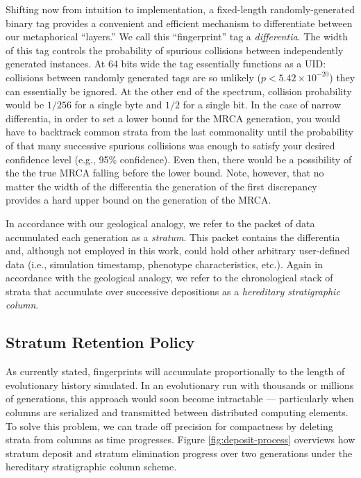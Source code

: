 Shifting now from intuition to implementation, a fixed-length randomly-generated binary tag provides a convenient and efficient mechanism to differentiate between our metaphorical ``layers.''
We call this ``fingerprint'' tag a \textit{differentia}.
The width of this tag controls the probability of spurious collisions between independently generated instances.
At 64 bits wide the tag essentially functions as a UID: collisions between randomly generated tags are so unlikely ($p < 5.42\times10^{-20}$) they can essentially be ignored.
At the other end of the spectrum, collision probability would be $1/256$ for a single byte and $1/2$ for a single bit.
In the case of narrow differentia, in order to set a lower bound for the MRCA generation, you would have to backtrack common strata from the last commonality until the probability of that many successive spurious collisions was enough to satisfy your desired confidence level (e.g., 95\% confidence).
Even then, there would be a possibility of the the true MRCA falling before the lower bound.
Note, however, that no matter the width of the differentia the generation of the first discrepancy provides a hard upper bound on the generation of the MRCA.

In accordance with our geological analogy, we refer to the packet of data accumulated each generation as a \textit{stratum}.
This packet contains the differentia and, although not employed in this work, could hold other arbitrary user-defined data (i.e., simulation timestamp, phenotype characteristics, etc.).
Again in accordance with the geological analogy, we refer to the chronological stack of strata that accumulate over successive depositions as a \textit{hereditary stratigraphic column}.

\subsection{Stratum Retention Policy}



As currently stated, fingerprints will accumulate proportionally to the length of evolutionary history simulated.
In an evolutionary run with thousands or millions of generations, this approach would soon become intractable --- particularly when columns are serialized and transmitted between distributed computing elements.
To solve this problem, we can trade off precision for compactness by deleting strata from columns as time progresses.
Figure \ref{fig:deposit-process} overviews how stratum deposit and stratum elimination progress over two generations under the hereditary stratigraphic column scheme.

